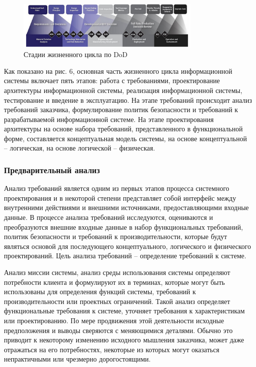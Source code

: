 \begin{figure}[H]
    \centering
    \includegraphics[width=0.8\textwidth]{assets/security/pic1.png}
    \caption{Стадии жизненного цикла по DoD}
    \label{fig:mesh03}
\end{figure}

Как показано на рис. 6, основная часть жизненного цикла информационной системы включает пять этапов: работа
с требованиями, проектирование архитектуры информационной системы, реализация информационной системы,
тестирование и введение в эксплуатацию. На этапе требований происходит анализ требований заказчика,
формулирование политик безопасности и требований к разрабатываемой информационной системе. На этапе проектирования
архитектуры на основе набора требований, представленного в функциональной форме, составляется концептуальная
модель системы, на основе концептуальной – логическая, на основе логической – физическая.

\subsubsection{Предварительный анализ}

Анализ требований является одним из первых этапов процесса системного проектирования и в некоторой степени
представляет собой интерфейс между внутренними действиями и внешними источниками, предоставляющими входные
данные. В процессе анализа требований исследуются, оцениваются и преобразуются внешние входные данные в
набор функциональных требований, политик безопасности и требований к производительности, которые будут являться
основой для последующего концептуального, логического и физического проектирований. Цель анализа требований –
определение требований к системе.

Анализ миссии системы, анализ среды использования системы определяют потребности клиента и формулируют их в терминах,
которые могут быть использованы для определения функций системы, требований к производительности или проектных
ограничений. Такой анализ определяет функциональные требования к системе, уточняет требования к характеристикам
или проектированию. По мере продвижения этой деятельности исходные предположения и выводы сверяются с меняющимися
деталями. Обычно это приводит к некоторому изменению исходного мышления заказчика, может даже отражаться на его
потребностях, некоторые из которых могут оказаться непрактичными или чрезмерно дорогостоящими.

